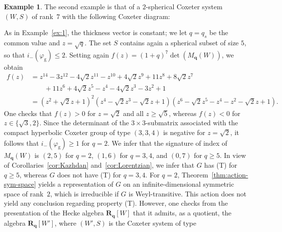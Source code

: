 \documentclass[12pt,a4paper]{amsproc}
\theoremstyle{definition}
\newtheorem{example}[theorem]{Example}
\newcommand{\RR}{\mathbf R}
\newcommand{\qq}{\mathbf q}
\newcommand{\rg}{\mathrm g}
\begin{document}
\begin{example}\label{ex:2}
The second example is that of a $2$-spherical  Coxeter system $(W, S)$ of rank~$7$ with the following Coxeter diagram:
\begin{center}
\end{center}
As in Example~\ref{ex:1}, the thickness vector is constant; we let $q = q_s$ be the common value and $z = \sqrt q$. The set $S$ contains again a spherical subset of size $5$, so that  $i_-(\varphi_\rg) \leq 2$. Setting again $ f(z) = (1+q)^7 \det(M_\qq(W)) $, we   obtain 
\begin{align*}
f(z) 
& = z^{14} - 3z^{12} - 4\sqrt 2 z^{11} - z^{10} + 4 \sqrt 2 z^9 + 11 z^8 + 8 \sqrt 2 z^7 \\
& \qquad  + 11 z^6 + 4 \sqrt 2 z^5 - z^4 - 4 \sqrt 2 z^3 - 3 z^2 + 1\\
&=(z^2+ \sqrt 2 z+1)^2 (z^4 - \sqrt 2 z^3 - \sqrt 2 z + 1 ) (z^6 - \sqrt 2 z^5 - z^4 - z^2 - \sqrt 2 z + 1).
\end{align*}
One checks that $f(z)> 0$ for $z =\sqrt 2$ and all $z \geq \sqrt 5$, whereas $f(z)<0$ for $z \in \{\sqrt 3, 2\}$. Since the determinant of the $3\times 3$-submatrix associated with the compact hyperbolic Coxeter group of type $(3, 3, 4)$ is negative for $z=\sqrt 2$, it follows that $i_-(\varphi_\rg) \geq 1$ for $q=2$. We infer  that the signature of  index of $M_\qq(W)$ is $(2, 5)$  for $q=2$, $(1, 6)$ for $q=3, 4$, and $(0, 7)$ for $q \geq 5$. In view of Corollaries~\ref{cor:Kazhdan} and~\ref{cor:Lorentzian}, we infer  that $G$ has (T) for $q \geq 5$, whereas $G$ does not have (T) for $q =3, 4$. For $q =2$, Theorem~\ref{thm:action-sym-space} yields a representation of $G$ on an infinite-dimensional symmetric space of rank~$2$, which is irreducible if $G$ is Weyl-transitive. This action does not yield any conclusion regarding property (T). However, one checks from the presentation of the Hecke algebra $\RR_\qq[W]$ that it admits, as a quotient, the algebra $\RR_\qq[W']$, where $(W', S)$ is the Coxeter system of type 

\end{example}
\end{document}
